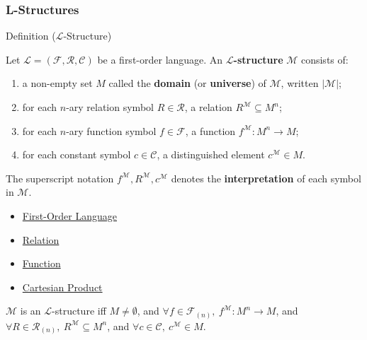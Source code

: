 
\subsubsection*{L-Structures}

\begin{definitionbox}{Definition ($\mathcal{L}$-Structure)}
\begin{definition}\label{def:l-structure}
Let $\mathcal{L} = (\mathcal{F}, \mathcal{R}, \mathcal{C})$ be a
first-order language.
An \textbf{$\mathcal{L}$-structure} $\mathcal{M}$ consists of:
\begin{enumerate}
  \item a non-empty set $M$ called the \textbf{domain} (or
        \textbf{universe}) of $\mathcal{M}$, written $|\mathcal{M}|$;
  \item for each $n$-ary relation symbol $R \in \mathcal{R}$,
        a relation $R^{\mathcal{M}} \subseteq M^n$;
  \item for each $n$-ary function symbol $f \in \mathcal{F}$,
        a function $f^{\mathcal{M}} : M^n \to M$;
  \item for each constant symbol $c \in \mathcal{C}$,
        a distinguished element $c^{\mathcal{M}} \in M$.
\end{enumerate}
The superscript notation $f^{\mathcal{M}}, R^{\mathcal{M}}, c^{\mathcal{M}}$
denotes the \textbf{interpretation} of each symbol in $\mathcal{M}$.
\end{definition}
\end{definitionbox}

\begin{dependencies}
\begin{itemize}
  \item \hyperref[def:first-order-language]{First-Order Language}
  \item \hyperref[def:relation]{Relation}
  \item \hyperref[def:function]{Function}
  \item \hyperref[def:cartesian-product]{Cartesian Product}
\end{itemize}
\end{dependencies}

\begin{remark*}
$\mathcal{M}$ is an $\mathcal{L}$-structure iff
$M \neq \emptyset$,
and $\forall f \in \mathcal{F}_{(n)},\ f^{\mathcal{M}} : M^n \to M$,
and $\forall R \in \mathcal{R}_{(n)},\ R^{\mathcal{M}} \subseteq M^n$,
and $\forall c \in \mathcal{C},\ c^{\mathcal{M}} \in M$.
\end{remark*}

